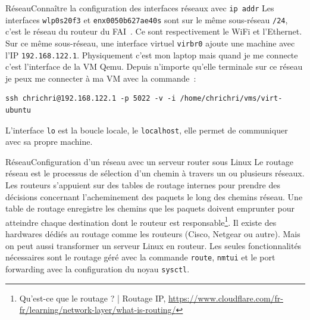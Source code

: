 \documentclass{beamer}
\begin{document}
    \begin{frame}[fragile]{Réseau}{Connaître la configuration des interfaces réseaux avec \lstinline{ip addr}}
        Les interfaces \lstinline{wlp0s20f3} et \lstinline{enx0050b627ae40s} sont sur le même sous-réseau \lstinline{/24}, c'est le réseau du routeur du FAI~.
        Ce sont respectivement le WiFi et l'Ethernet.
        \bigbreak
        Sur ce même sous-réseau, une interface virtuel \lstinline{virbr0} ajoute une machine avec l'IP \lstinline{192.168.122.1}.
        Physiquement c'est mon laptop mais quand je me connecte c'est l'interface de la VM Qemu.
        Depuis n'importe qu'elle terminale sur ce réseau je peux me connecter à ma VM avec la commande~:
        \begin{lstlisting}
ssh chrichri@192.168.122.1 -p 5022 -v -i /home/chrichri/vms/virt-ubuntu
        \end{lstlisting}
        \bigbreak
        L'interface \lstinline{lo} est la boucle locale, le \lstinline{localhost}, elle permet de communiquer avec sa propre machine.
    \end{frame}

    \begin{frame}{Réseau}{Configuration d'un réseau avec un serveur router sous Linux}
        Le routage réseau est le processus de sélection d'un chemin à travers un ou plusieurs réseaux.
        Les routeurs s'appuient sur des tables de routage internes pour prendre des décisions concernant l'acheminement des paquets le long des chemins réseau.
        Une table de routage enregistre les chemins que les paquets doivent emprunter pour atteindre chaque destination dont le routeur est responsable\footnote{Qu'est-ce que le routage ? | Routage IP, \url{https://www.cloudflare.com/fr-fr/learning/network-layer/what-is-routing/}}.
        Il existe des hardwares dédiés au routage comme les routeurs (Cisco, Netgear ou autre).
        \bigbreak
        Mais on peut aussi transformer un serveur Linux en routeur.
        Les seules fonctionnalités nécessaires sont le routage géré avec la commande \lstinline{route}, \lstinline{nmtui} et le port forwarding avec la configuration du noyau \lstinline{sysctl}.
    \end{frame}
\end{document}
